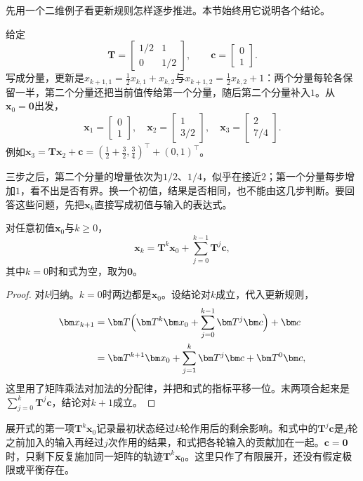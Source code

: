 先用一个二维例子看更新规则怎样逐步推进。本节始终用它说明各个结论。
\begin{example}[贯穿本节的更新]
\label{ex:ls-affine-running-example}
给定
\[
 \bm T=\begin{bmatrix}1/2&1\\0&1/2\end{bmatrix},\qquad
 \bm c=\begin{bmatrix}0\\1\end{bmatrix}.
\]
写成分量，更新是$x_{k+1,1}=\tfrac12x_{k,1}+x_{k,2}$与$x_{k+1,2}=\tfrac12x_{k,2}+1$：两个分量每轮各保留一半，第二个分量还把当前值传给第一个分量，随后第二个分量补入$1$。从$\bm x_0=\bm0$出发，
\[
 \bm x_1=\begin{bmatrix}0\\1\end{bmatrix},\quad
 \bm x_2=\begin{bmatrix}1\\3/2\end{bmatrix},\quad
 \bm x_3=\begin{bmatrix}2\\7/4\end{bmatrix}.
\]
例如$\bm x_3=\bm T\bm x_2+\bm c=(\tfrac12+\tfrac32,\tfrac34)^\top+(0,1)^\top$。
\end{example}
三步之后，第二个分量的增量依次为$1/2$、$1/4$，似乎在接近$2$；第一个分量每步增加$1$，看不出是否有界。换一个初值，结果是否相同，也不能由这几步判断。要回答这些问题，先把$\bm x_k$直接写成初值与输入的表达式。

\begin{lemma}[递推的有限展开]
\label{lem:ls-affine-unrolling}
对任意初值$\bm x_0$与$k\geq0$，
\[
 \bm x_k=\bm T^k\bm x_0+\sum_{j=0}^{k-1}\bm T^j\bm c ,
\]
其中$k=0$时和式为空，取为$\bm0$。
\end{lemma}
\begin{proof}
对$k$归纳。$k=0$时两边都是$\bm x_0$。设结论对$k$成立，代入更新规则，
\[
\begin{aligned}
 \bm x_{k+1}&=\bm T\Bigl(\bm T^k\bm x_0+\sum_{j=0}^{k-1}\bm T^j\bm c\Bigr)+\bm c\\
 &=\bm T^{k+1}\bm x_0+\sum_{j=1}^{k}\bm T^j\bm c+\bm T^0\bm c ,
\end{aligned}
\]
这里用了矩阵乘法对加法的分配律，并把和式的指标平移一位。末两项合起来是$\sum_{j=0}^{k}\bm T^j\bm c$，结论对$k+1$成立。
\end{proof}
展开式的第一项$\bm T^k\bm x_0$记录最初状态经过$k$轮作用后的剩余影响。和式中的$\bm T^j\bm c$是$j$轮之前加入的输入再经过$j$次作用的结果，和式把各轮输入的贡献加在一起。$\bm c=\bm0$时，只剩下反复施加同一矩阵的轨迹$\bm T^k\bm x_0$。这里只作了有限展开，还没有假定极限或平衡存在。

